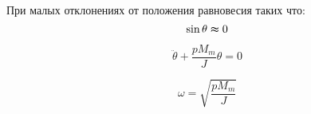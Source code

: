 \documentclass{article}
\begin{document}
При малых отклонениях от положения равновесия таких что:
\begin{equation}
    \sin{\theta} \thickapprox 0
\end{equation}

\begin{equation}
    \label{rotor_like_harmonical_oscilator_equation}
    \ddot{\theta} + \frac{p M_{m}}{J} \theta = 0 
\end{equation}

\begin{equation}
    \label{friquent_for_rotor_self_oscilating}
    \omega = \sqrt{\frac{p M_{m}}{J}}
\end{equation}

\newpage
\end{document}
